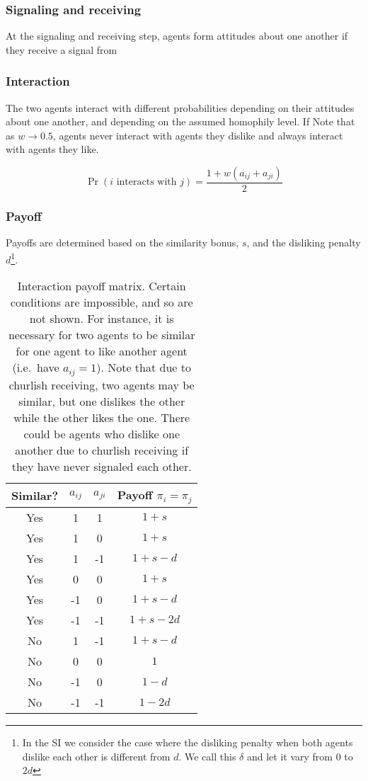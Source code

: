 \documentclass[11pt,letterpaper]{article}
\begin{document}
\subsubsection{Signaling and receiving}

At the signaling and receiving step, agents form attitudes about one another if
they receive a signal from 

\subsubsection{Interaction}

The two agents interact with different probabilities
depending on their attitudes about one another, and depending on the 
assumed homophily level. If  Note that as $w \rightarrow 0.5$,
agents never interact with agents they dislike and always interact with 
agents they like.

\begin{equation}
  \Pr(\text{$i$ interacts with $j$}) = \frac{1 + w(a_{ij} + a_{ji})}{2}
\end{equation}
\noindent

\subsubsection{Payoff}

Payoffs are determined based on the similarity bonus, $s$, and the disliking
penalty $d$\footnote{In the SI we consider the case where the disliking penalty 
when both agents dislike each other is different from $d$. We call this $\delta$
and let it vary from 0 to $2d$}. 

\begin{table}[h]
  \centering
  \begin{tabular}{cccc}
    Similar? & $a_{ij}$ & $a_{ji}$ & Payoff $\pi_i = \pi_j$ \\
    \toprule
    Yes   & 1 & 1   & $1 + s$ \\
    Yes   & 1 & 0   & $1 + s$ \\
    Yes   & 1 & -1  & $1 + s - d$ \\
    Yes   & 0 & 0   & $1 + s$ \\
    Yes   & -1 & 0  & $1 + s - d$ \\
    Yes   & -1 & -1 & $1 + s - 2d$ \\
    \midrule
    No    & 1 & -1  & $1 + s - d$ \\
    No    & 0 & 0   & $1$ \\
    No    & -1 & 0  & $1 - d$ \\
    No    & -1 & -1 & $1 - 2d$ \\
  \end{tabular}
  \caption{Interaction payoff matrix. Certain conditions are impossible, and so are not
  shown. For instance, it is necessary for two agents to be similar for 
  one agent to like another agent (i.e.\ have $a_{ij} = 1$). Note that
  due to churlish receiving, two agents may be similar, but one dislikes the
  other while the other likes the one. There could be agents who dislike one
  another due to churlish receiving if they have never signaled each other.}
\end{table}
\end{document}
